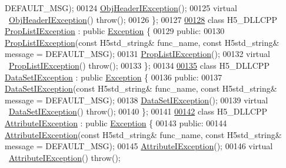 \begin{DoxyCode}
       DEFAULT\_MSG);
00124         \hyperlink{class_h5_1_1_obj_header_i_exception}{ObjHeaderIException}();
00125         \textcolor{keyword}{virtual} ~\hyperlink{class_h5_1_1_obj_header_i_exception}{ObjHeaderIException}() \textcolor{keywordflow}{throw}();
00126 \};
00127 
\hyperlink{class_h5_1_1_prop_list_i_exception}{00128} \textcolor{keyword}{class }H5\_DLLCPP \hyperlink{class_h5_1_1_prop_list_i_exception}{PropListIException} : \textcolor{keyword}{public} \hyperlink{class_h5_1_1_exception}{Exception} \{
00129    \textcolor{keyword}{public}:
00130         \hyperlink{class_h5_1_1_prop_list_i_exception}{PropListIException}(\textcolor{keyword}{const} H5std\_string& func\_name, \textcolor{keyword}{const} H5std\_string& message = 
      DEFAULT\_MSG);
00131         \hyperlink{class_h5_1_1_prop_list_i_exception}{PropListIException}();
00132         \textcolor{keyword}{virtual} ~\hyperlink{class_h5_1_1_prop_list_i_exception}{PropListIException}() \textcolor{keywordflow}{throw}();
00133 \};
00134 
\hyperlink{class_h5_1_1_data_set_i_exception}{00135} \textcolor{keyword}{class }H5\_DLLCPP \hyperlink{class_h5_1_1_data_set_i_exception}{DataSetIException} : \textcolor{keyword}{public} \hyperlink{class_h5_1_1_exception}{Exception} \{
00136    \textcolor{keyword}{public}:
00137         \hyperlink{class_h5_1_1_data_set_i_exception}{DataSetIException}(\textcolor{keyword}{const} H5std\_string& func\_name, \textcolor{keyword}{const} H5std\_string& message = 
      DEFAULT\_MSG);
00138         \hyperlink{class_h5_1_1_data_set_i_exception}{DataSetIException}();
00139         \textcolor{keyword}{virtual} ~\hyperlink{class_h5_1_1_data_set_i_exception}{DataSetIException}() \textcolor{keywordflow}{throw}();
00140 \};
00141 
\hyperlink{class_h5_1_1_attribute_i_exception}{00142} \textcolor{keyword}{class }H5\_DLLCPP \hyperlink{class_h5_1_1_attribute_i_exception}{AttributeIException} : \textcolor{keyword}{public} \hyperlink{class_h5_1_1_exception}{Exception} \{
00143    \textcolor{keyword}{public}:
00144         \hyperlink{class_h5_1_1_attribute_i_exception}{AttributeIException}(\textcolor{keyword}{const} H5std\_string& func\_name, \textcolor{keyword}{const} H5std\_string& message =
       DEFAULT\_MSG);
00145         \hyperlink{class_h5_1_1_attribute_i_exception}{AttributeIException}();
00146         \textcolor{keyword}{virtual} ~\hyperlink{class_h5_1_1_attribute_i_exception}{AttributeIException}() \textcolor{keywordflow}{throw}();

\end{DoxyCode}
